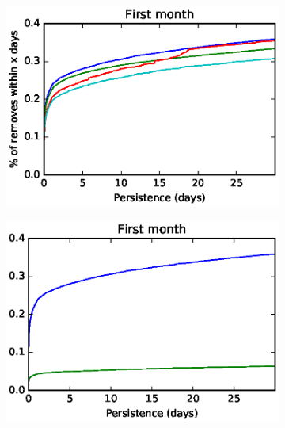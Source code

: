 \begin{figure}[h]
    \begin{subfigure}{.5\textwidth}
        \centering
        \includegraphics[keepaspectratio=true, width=1\linewidth]{assets/irrelevant_identifiers_persistence_cdf_1month}
\label{fig:irrelevant_identifiers_persistence_cdf_1month}
    \end{subfigure}%
    \begin{subfigure}{.5\textwidth}
        \centering
        \includegraphics[keepaspectratio=true, width=1\linewidth]{assets/irrelevant_doi_persistence_cdf_1month}
\label{fig:irrelevant_doi_persistence_cdf_1month}
    \end{subfigure}


\end{figure}
